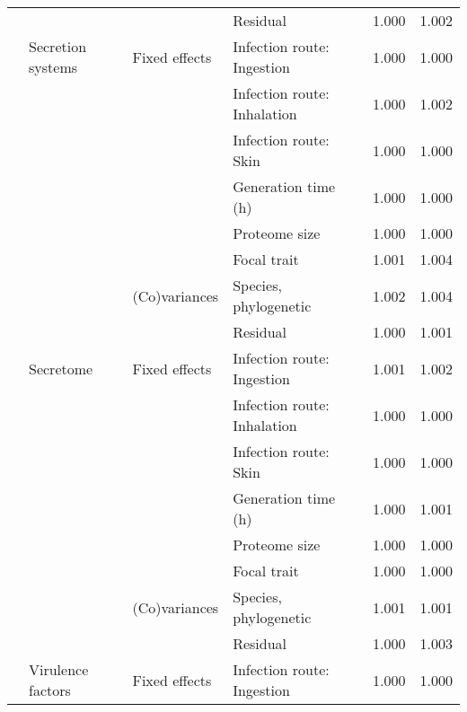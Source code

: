 \begin{longtable}[t]{llllll}
\hspace{1em} &  &  & Residual & 1.000 & \vphantom{1} 1.002\\
\hspace{1em} & Secretion systems & Fixed effects & Infection route: Ingestion & 1.000 & 1.000\\
\hspace{1em} &  &  & Infection route: Inhalation & 1.000 & 1.002\\
\hspace{1em} &  &  & Infection route: Skin & 1.000 & \vphantom{1} 1.000\\
\hspace{1em} &  &  & Generation time (h) & 1.000 & \vphantom{1} 1.000\\
\hspace{1em} &  &  & Proteome size & 1.000 & \vphantom{1} 1.000\\
\hspace{1em} &  &  & Focal trait & 1.001 & 1.004\\
\hspace{1em} &  & (Co)variances & Species, phylogenetic & 1.002 & 1.004\\
\hspace{1em} &  &  & Residual & 1.000 & 1.001\\
\hspace{1em} & Secretome & Fixed effects & Infection route: Ingestion & 1.001 & 1.002\\
\hspace{1em} &  &  & Infection route: Inhalation & 1.000 & \vphantom{1} 1.000\\
\hspace{1em} &  &  & Infection route: Skin & 1.000 & 1.000\\
\hspace{1em} &  &  & Generation time (h) & 1.000 & 1.001\\
\hspace{1em} &  &  & Proteome size & 1.000 & 1.000\\
\hspace{1em} &  &  & Focal trait & 1.000 & \vphantom{1} 1.000\\
\hspace{1em} &  & (Co)variances & Species, phylogenetic & 1.001 & 1.001\\
\hspace{1em} &  &  & Residual & 1.000 & 1.003\\
\hspace{1em} & Virulence factors & Fixed effects & Infection route: Ingestion & 1.000 & 1.000\\

\end{longtable}

